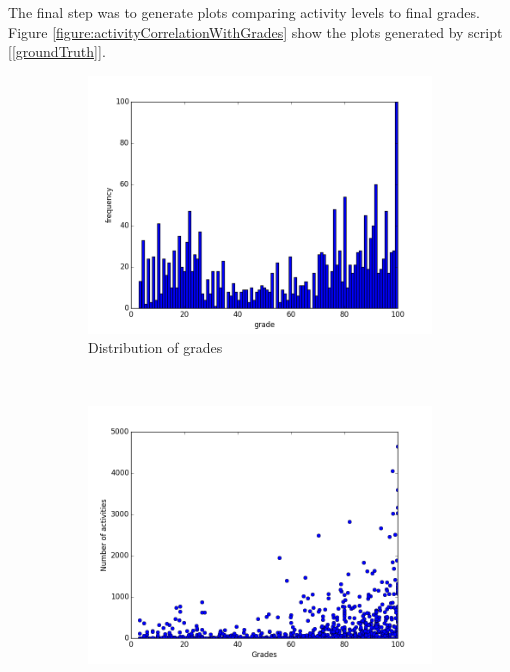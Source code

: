 \documentclass[11pt, oneside]{article}   	%
\begin{document}
\noindent The final step was to generate plots comparing activity levels to final grades. Figure \ref{figure:activityCorrelationWithGrades} show the plots generated by script  [\ref{groundTruth}].
\begin{figure}
        \centering
        \begin{subfigure}[b]{0.4\textwidth}
                \includegraphics[width=\textwidth]{./pythonScripts/generalStatistics/distributionGrades.png}
                \caption{Distribution of grades}
                \label{distOfGrades}
        \end{subfigure}
        ~ %
         \begin{subfigure}[b]{0.4\textwidth}
                \includegraphics[width=\textwidth]{./pythonScripts/allActivities.png}

\end{subfigure}
\end{figure}
\end{document}

